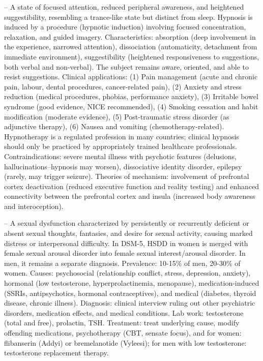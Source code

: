 -- A state of focused attention, reduced peripheral awareness, and heightened suggestibility, resembling a trance-like state but distinct from sleep. Hypnosis is induced by a procedure (hypnotic induction) involving focused concentration, relaxation, and guided imagery. Characteristics: absorption (deep involvement in the experience, narrowed attention), dissociation (automaticity, detachment from immediate environment), suggestibility (heightened responsiveness to suggestions, both verbal and non-verbal). The subject remains aware, oriented, and able to resist suggestions. Clinical applications: (1) Pain management (acute and chronic pain, labour, dental procedures, cancer-related pain), (2) Anxiety and stress reduction (medical procedures, phobias, performance anxiety), (3) Irritable bowel syndrome (good evidence, NICE recommended), (4) Smoking cessation and habit modification (moderate evidence), (5) Post-traumatic stress disorder (as adjunctive therapy), (6) Nausea and vomiting (chemotherapy-related). Hypnotherapy is a regulated profession in many countries; clinical hypnosis should only be practiced by appropriately trained healthcare professionals. Contraindications: severe mental illness with psychotic features (delusions, hallucinations--hypnosis may worsen), dissociative identity disorder, epilepsy (rarely, may trigger seizure). Theories of mechanism: involvement of prefrontal cortex deactivation (reduced executive function and reality testing) and enhanced connectivity between the prefrontal cortex and insula (increased body awareness and interoception).

-- A sexual dysfunction characterized by persistently or recurrently deficient or absent sexual thoughts, fantasies, and desire for sexual activity, causing marked distress or interpersonal difficulty. In DSM-5, HSDD in women is merged with female sexual arousal disorder into female sexual interest/arousal disorder. In men, it remains a separate diagnosis. Prevalence: 10-15\% of men, 20-30\% of women. Causes: psychosocial (relationship conflict, stress, depression, anxiety), hormonal (low testosterone, hyperprolactinemia, menopause), medication-induced (SSRIs, antipsychotics, hormonal contraceptives), and medical (diabetes, thyroid disease, chronic illness). Diagnosis: clinical interview ruling out other psychiatric disorders, medication effects, and medical conditions. Lab work: testosterone (total and free), prolactin, TSH. Treatment: treat underlying cause, modify offending medications, psychotherapy (CBT, sensate focus), and for women: flibanserin (Addyi) or bremelanotide (Vyleesi); for men with low testosterone: testosterone replacement therapy.

